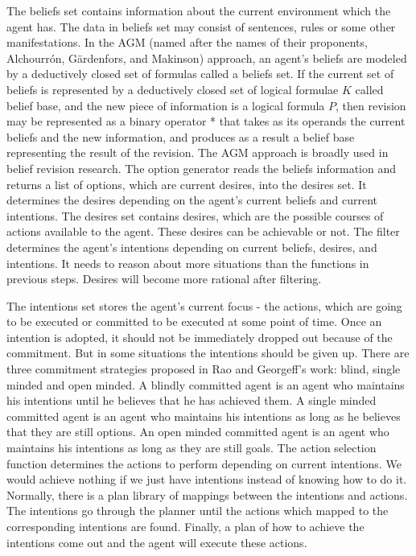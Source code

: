 The beliefs set contains information about the current environment which the agent has. The data in beliefs set may consist of sentences, rules or some other manifestations. In the AGM (named after the names of their proponents, Alchourrón, Gärdenfors, and Makinson)\cite{alchourron_revision_1985} approach, an agent’s beliefs are modeled by a deductively closed set of formulas called a beliefs set\cite{James_revise_2011}.
If the current set of beliefs is represented by a deductively closed set of logical formulae $K$ called belief base, and the new piece of information is a logical formula $P$, then revision may be represented as a binary operator * that takes as its operands the current beliefs and the new information, and produces as a result a belief base representing the result of the revision\cite{M_Belief}. The AGM approach is broadly used in belief revision research.
The option generator reads the beliefs information and returns a list of options, which are current desires, into the desires set. It determines the desires depending on the agent’s current beliefs and current intentions. The desires set contains desires, which are the possible courses of actions available to the agent. These desires can be achievable or not. The filter determines the agent’s intentions depending on current beliefs, desires, and intentions. It needs to reason about more situations than the functions in previous steps. Desires will become more rational after filtering.

The intentions set stores the agent’s current focus - the actions, which are going to be executed or committed to be executed at some point of time. Once an intention is adopted, it should not be immediately dropped out because of the commitment. But in some situations the intentions should be given up. There are  three commitment strategies proposed in Rao and Georgeff’s work: blind, single minded and open minded. A blindly committed agent is an agent who maintains his intentions until he believes that he has achieved them. A single minded committed agent is an agent who maintains his intentions as long as he believes that they are still options. An open minded committed agent is an agent who maintains his intentions as long as they are still goals\cite{Roberto_BDIATL_2005}. The action selection function determines the actions to perform depending on current intentions. We would achieve nothing if we just have intentions instead of knowing how to do it. Normally, there is a plan library of mappings between the intentions and actions. The intentions go through the planner until the actions which mapped to the corresponding intentions are found. Finally, a plan of how to achieve the intentions come out and the agent will execute these actions.

